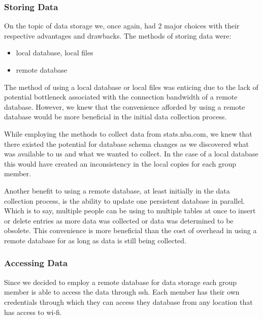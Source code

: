 \subsubsection{Storing Data}
On the topic of data storage we, once again, had 2 major choices with their respective advantages and drawbacks. The methods of storing data were:
\begin{itemize}
\item local database, local files
\item remote database
\end{itemize}
The method of using a local database or local files was enticing due to the lack of potential bottleneck associated with the connection bandwidth of a remote database. However, we knew that the convenience afforded by using a remote database would be more beneficial in the initial data collection process.

While employing the methods to collect data from stats.nba.com, we knew that there existed the potential for database schema changes as we discovered what was available to us and what we wanted to collect. In the case of a local database this would have created an inconsistency in the local copies for each group member. 

Another benefit to using a remote database, at least initially in the data collection process, is the ability to update one persistent database in parallel. Which is to say, multiple people can be using to multiple tables at once to insert or delete entries as more data was collected or data was determined to be obsolete. This convenience is more beneficial than the cost of overhead in using a remote database for as long as data is still being collected. 


\subsubsection{Accessing Data}

Since we decided to employ a remote database for data storage each group member is able to access the data through ssh. Each member has their own credentials through which they can access they database from any location that has access to wi-fi.



